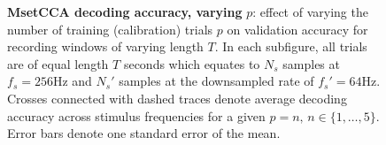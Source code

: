 \begin{figure}[htp]
\hfill
{}


\caption[MsetCCA decoding accuracy, varying $p$: effect of varying the number of training (calibration) trials $p$ on validation accuracy for recording windows of varying length $T$.]{\textbf{MsetCCA decoding accuracy, varying }$p$: effect of varying the number of training (calibration) trials $p$ on validation accuracy for recording windows of varying length $T$. In each subfigure, all trials are of equal length $T$ seconds which equates to $N_s$ samples at $f_s=256$Hz and $N_s'$ samples at the downsampled rate of $f_s'=64$Hz. Crosses connected with dashed traces denote average decoding accuracy across stimulus frequencies for a given $p=n, \, n\in\{1, \dots, 5\}$. Error bars denote one standard error of the mean.}
\label{fig:mset-acc-nt}
\end{figure}

